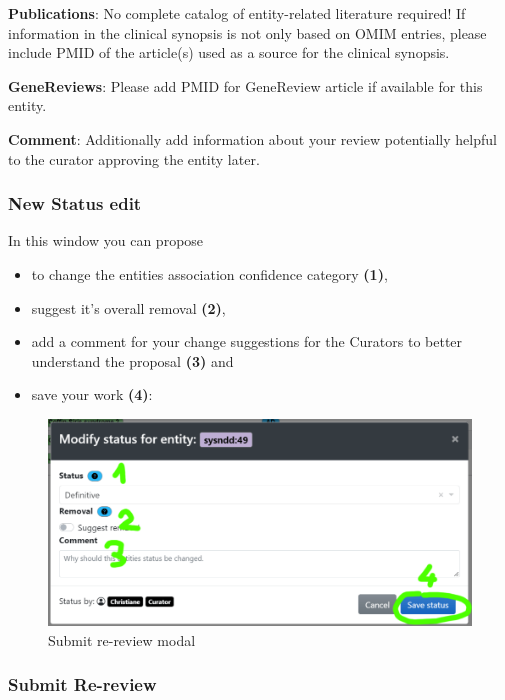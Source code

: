 \documentclass[
]{article}
\providecommand{\tightlist}{%
  \setlength{\itemsep}{0pt}\setlength{\parskip}{0pt}}
\begin{document}
\textbf{Publications}: No complete catalog of entity-related literature required! If information in the clinical synopsis is not only based on OMIM entries, please include PMID of the article(s) used as a source for the clinical synopsis.

\textbf{GeneReviews}: Please add PMID for GeneReview article if available for this entity.

\textbf{Comment}: Additionally add information about your review potentially helpful to the curator approving the entity later.

\hypertarget{new-status-edit}{%
\subsubsection{New Status edit}\label{new-status-edit}}

In this window you can propose

\begin{itemize}
\tightlist
\item
  to change the entities association confidence category \textbf{(1)},
\item
  suggest it's overall removal \textbf{(2)},
\item
  add a comment for your change suggestions for the Curators to better understand the proposal \textbf{(3)} and
\item
  save your work \textbf{(4)}:
\end{itemize}

\begin{figure}
\centering
\includegraphics{./static/img/modal_modify_status.png}
\caption{Submit re-review modal}
\end{figure}

\hypertarget{submit-re-review}{%
\subsubsection{Submit Re-review}\label{submit-re-review}}
\end{document}
